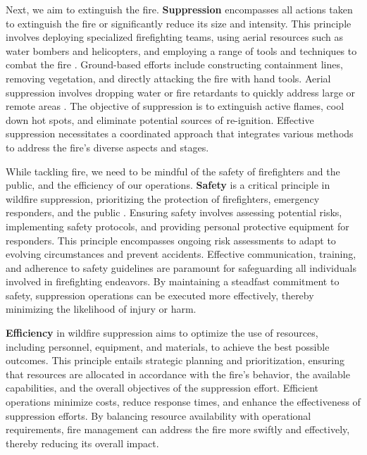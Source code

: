 \documentclass[
  12 pt,
]{Nemilov}
\begin{document}
Next, we aim to extinguish the fire. \textbf{Suppression} encompasses all actions taken to extinguish the fire or significantly reduce its size and intensity. This principle involves deploying specialized firefighting teams, using aerial resources such as water bombers and helicopters, and employing a range of tools and techniques to combat the fire \citep{kennedy2019values, underwood2012wildfire}. Ground-based efforts include constructing containment lines, removing vegetation, and directly attacking the fire with hand tools. Aerial suppression involves dropping water or fire retardants to quickly address large or remote areas \citep{plucinski2013criteria}. The objective of suppression is to extinguish active flames, cool down hot spots, and eliminate potential sources of re-ignition. Effective suppression necessitates a coordinated approach that integrates various methods to address the fire's diverse aspects and stages.

While tackling fire, we need to be mindful of the safety of firefighters and the public, and the efficiency of our operations. \textbf{Safety} is a critical principle in wildfire suppression, prioritizing the protection of firefighters, emergency responders, and the public \citep{plucinski2019fighting, tedim2020safety}. Ensuring safety involves assessing potential risks, implementing safety protocols, and providing personal protective equipment for responders. This principle encompasses ongoing risk assessments to adapt to evolving circumstances and prevent accidents. Effective communication, training, and adherence to safety guidelines are paramount for safeguarding all individuals involved in firefighting endeavors. By maintaining a steadfast commitment to safety, suppression operations can be executed more effectively, thereby minimizing the likelihood of injury or harm.

\textbf{Efficiency} in wildfire suppression aims to optimize the use of resources, including personnel, equipment, and materials, to achieve the best possible outcomes. This principle entails strategic planning and prioritization, ensuring that resources are allocated in accordance with the fire's behavior, the available capabilities, and the overall objectives of the suppression effort. Efficient operations minimize costs, reduce response times, and enhance the effectiveness of suppression efforts. By balancing resource availability with operational requirements, fire management can address the fire more swiftly and effectively, thereby reducing its overall impact.
\end{document}
